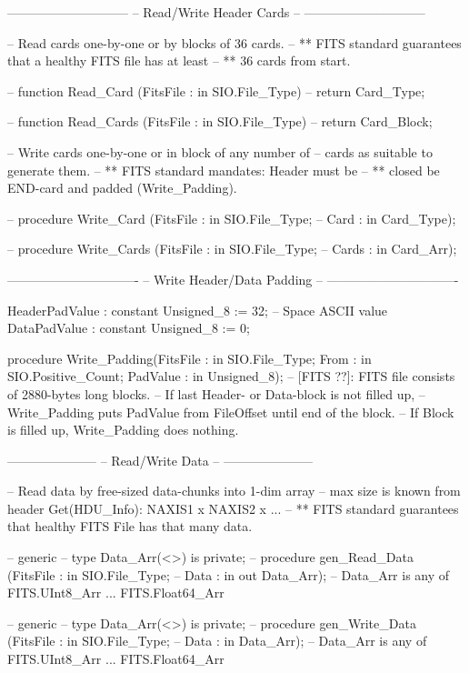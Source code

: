    -----------------------------
   -- Read/Write Header Cards --
   -----------------------------

   -- Read cards one-by-one or by blocks of 36 cards.
   -- ** FITS standard guarantees that a healthy FITS file has at least
   -- ** 36 cards from start.

--   function Read_Card  (FitsFile  : in  SIO.File_Type)
  --   return Card_Type;

--   function Read_Cards (FitsFile  : in  SIO.File_Type)
  --   return Card_Block;

   -- Write cards one-by-one or in block of any number of
   -- cards as suitable to generate them.
   -- ** FITS standard mandates: Header must be
   -- ** closed be END-card and padded (Write_Padding).

--   procedure Write_Card  (FitsFile : in SIO.File_Type;
  --                        Card     : in Card_Type);

 --  procedure Write_Cards (FitsFile : in SIO.File_Type;
   --                       Cards    : in Card_Arr);


   -------------------------------
   -- Write Header/Data Padding --
   -------------------------------

   HeaderPadValue : constant Unsigned_8 := 32; -- Space ASCII value
   DataPadValue   : constant Unsigned_8 :=  0;

   procedure Write_Padding(FitsFile : in SIO.File_Type;
                           From     : in SIO.Positive_Count;
                           PadValue : in Unsigned_8);
   -- [FITS ??]: FITS file consists of 2880-bytes long blocks.
   -- If last Header- or Data-block is not filled up,
   -- Write_Padding puts PadValue from FileOffset until end of the block.
   -- If Block is filled up, Write_Padding does nothing.


   ---------------------
   -- Read/Write Data --
   ---------------------

   -- Read data by free-sized data-chunks into 1-dim array
   -- max size is known from header Get(HDU_Info): NAXIS1 x NAXIS2 x ...
   -- ** FITS standard guarantees that healthy FITS File has that many data.

--   generic
--     type Data_Arr(<>) is private;
--   procedure gen_Read_Data (FitsFile : in  SIO.File_Type;
--                            Data     : in out Data_Arr);
   -- Data_Arr is any of FITS.UInt8_Arr ... FITS.Float64_Arr

--   generic
--     type Data_Arr(<>) is private;
--   procedure gen_Write_Data (FitsFile : in SIO.File_Type;
 --                            Data     : in Data_Arr);
   -- Data_Arr is any of FITS.UInt8_Arr ... FITS.Float64_Arr

